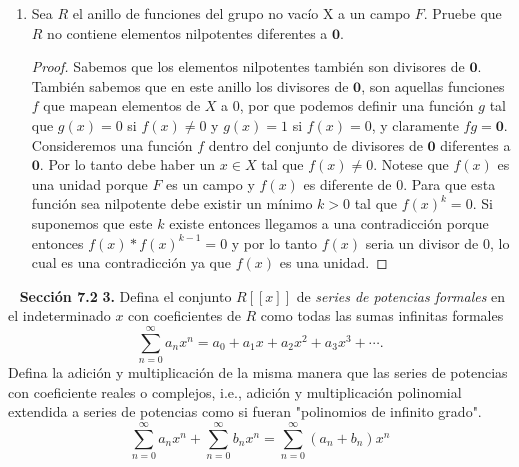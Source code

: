 \documentclass[letter,twoside,12pt]{article}
\begin{document}
\begin{enumerate}[label=\textbf{(\alph*)}]
\begin{proof}
Utilizando el resultado anterior concluimos que los elementos nilpotentes de $\mathbb{Z}/72\mathbb{Z}$ ($72=2^33^2$) son $\overline{0}, \overline{6}, \overline{12}, \overline{18}, \overline{24}, \overline{30}, \overline{36},\overline{42}, \overline{48}, \overline{54}, \overline{60}$ y $\overline{66}$.
\end{proof}
\item Sea $R$ el anillo de funciones del grupo no vac\'io X a un campo $F$. Pruebe que $R$ no contiene elementos nilpotentes diferentes a $\textbf{0}$.
\begin{proof}
Sabemos que los elementos nilpotentes tambi\'en son divisores de $\textbf{0}$. Tambi\'en sabemos que en este anillo los divisores de $\textbf{0}$, son aquellas funciones $f$ que mapean elementos de $X$ a 0, por que podemos definir una funci\'on $g$ tal que $g(x)=0$ si $f(x) \not = 0$ y $g(x)=1$ si $f(x)=0$, y claramente $fg=\textbf{0}$. Consideremos una funci\'on $f$ dentro del conjunto de divisores de $\textbf{0}$ diferentes a $\textbf{0}$. Por lo tanto debe haber un $x \in X$ tal que $f(x)\not = 0$. Notese que $f(x)$ es una unidad porque $F$ es un campo y $f(x)$ es diferente de 0. Para que esta funci\'on sea nilpotente debe existir un m\'inimo $k>0$ tal que $f(x)^k=0$. Si suponemos que este $k$ existe entonces llegamos a una contradicci\'on porque entonces $f(x)*f(x)^{k-1}=0$ y por lo tanto $f(x)$ seria un divisor de 0, lo cual es una contradicci\'on ya que $f(x)$ es una unidad.
\end{proof}
\end{enumerate}
\newpage
\mbox{ }
\newpage
\textbf{Secci\'on 7.2} \textbf{3.} Defina el conjunto $R[[x]]$ de \textit{series de potencias formales} en el indeterminado $x$ con coeficientes de $R$ como todas las sumas infinitas formales 
\begin{equation}
\sum_{n=0}^{\infty} a_nx^n = a_0+a_1x+a_2x^2+a_3x^3+ \cdots. \nonumber
\end{equation}
Defina la adici\'on y multiplicaci\'on de la misma manera que las series de potencias con coeficiente reales o complejos, i.e., adici\'on y multiplicaci\'on polinomial extendida a series de potencias como si fueran "polinomios de infinito grado".
\begin{equation}
\sum_{n=0}^{\infty}a_nx^n + \sum_{n=0}^{\infty}b_nx^n = \sum_{n=0}^{\infty}(a_n+b_n)x^n\nonumber
\nonumber
\end{equation}
\end{document}
